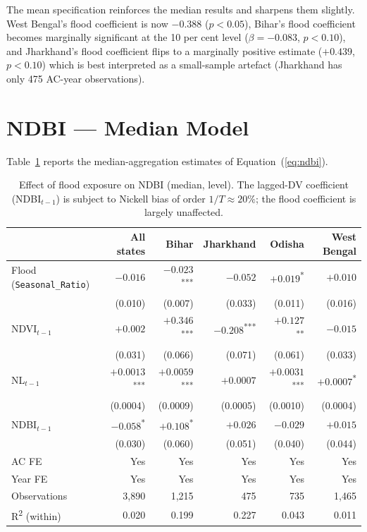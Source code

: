 \documentclass[12pt,a4paper,oneside]{report}
\begin{document}
The mean specification reinforces the median results and sharpens them slightly. West Bengal's flood coefficient is now $-0.388$ ($p<0.05$), Bihar's flood coefficient becomes marginally significant at the 10 per cent level ($\beta = -0.083$, $p<0.10$), and Jharkhand's flood coefficient flips to a marginally positive estimate ($+0.439$, $p<0.10$) which is best interpreted as a small-sample artefact (Jharkhand has only 475 AC-year observations).

\section{NDBI --- Median Model}
Table~\ref{tab:ndbi-median} reports the median-aggregation estimates of Equation~(\ref{eq:ndbi}).

\begin{table}[h]
\centering
\caption{Effect of flood exposure on NDBI (median, level). The lagged-DV coefficient (NDBI$_{t-1}$) is subject to Nickell bias of order $1/T \approx 20\%$; the flood coefficient is largely unaffected.}
\label{tab:ndbi-median}
\begin{tabular}{lrrrrr}
\toprule
 & \textbf{All states} & \textbf{Bihar} & \textbf{Jharkhand} & \textbf{Odisha} & \textbf{West Bengal} \\
\midrule
Flood (\texttt{Seasonal\_Ratio}) & $-0.016$        & $-0.023$\textsuperscript{***} & $-0.052$ & $+0.019$\textsuperscript{*} & $+0.010$ \\
                                  & (0.010)        & (0.007) & (0.033) & (0.011) & (0.016) \\
NDVI$_{t-1}$                      & $+0.002$        & $+0.346$\textsuperscript{***} & $-0.208$\textsuperscript{***} & $+0.127$\textsuperscript{**} & $-0.015$ \\
                                  & (0.031)        & (0.066) & (0.071) & (0.061) & (0.033) \\
NL$_{t-1}$                        & $+0.0013$\textsuperscript{***} & $+0.0059$\textsuperscript{***} & $+0.0007$ & $+0.0031$\textsuperscript{***} & $+0.0007$\textsuperscript{*} \\
                                  & (0.0004)       & (0.0009) & (0.0005) & (0.0010) & (0.0004) \\
NDBI$_{t-1}$                      & $-0.058$\textsuperscript{*}  & $+0.108$\textsuperscript{*} & $+0.026$ & $-0.029$ & $+0.015$ \\
                                  & (0.030)        & (0.060) & (0.051) & (0.040) & (0.044) \\
\midrule
AC FE      & Yes & Yes & Yes & Yes & Yes \\
Year FE    & Yes & Yes & Yes & Yes & Yes \\
Observations & 3{,}890 & 1{,}215 & 475 & 735 & 1{,}465 \\
R\textsuperscript{2} (within) & 0.020 & 0.199 & 0.227 & 0.043 & 0.011 \\
\bottomrule
\end{tabular}
\end{table}
\end{document}
